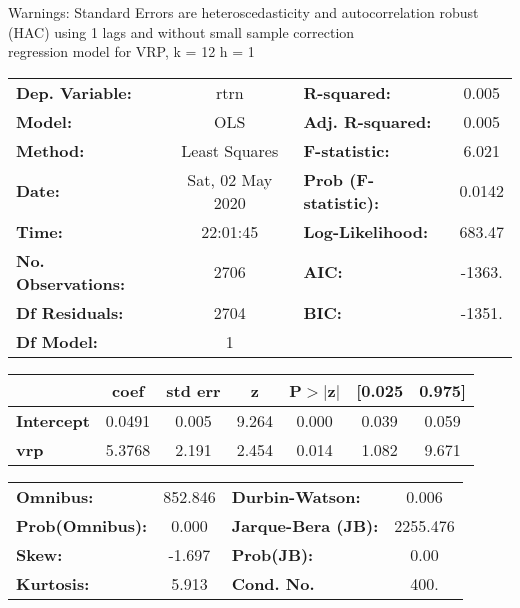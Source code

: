 Warnings: \newline
 [1] Standard Errors are heteroscedasticity and autocorrelation robust (HAC) using 1 lags and without small sample correction\\ 

regression model for VRP, k = 12 h = 1\begin{center}
\begin{tabular}{lclc}
\toprule
\textbf{Dep. Variable:}    &       rtrn       & \textbf{  R-squared:         } &     0.005   \\
\textbf{Model:}            &       OLS        & \textbf{  Adj. R-squared:    } &     0.005   \\
\textbf{Method:}           &  Least Squares   & \textbf{  F-statistic:       } &     6.021   \\
\textbf{Date:}             & Sat, 02 May 2020 & \textbf{  Prob (F-statistic):} &   0.0142    \\
\textbf{Time:}             &     22:01:45     & \textbf{  Log-Likelihood:    } &    683.47   \\
\textbf{No. Observations:} &        2706      & \textbf{  AIC:               } &    -1363.   \\
\textbf{Df Residuals:}     &        2704      & \textbf{  BIC:               } &    -1351.   \\
\textbf{Df Model:}         &           1      & \textbf{                     } &             \\
\bottomrule
\end{tabular}
\begin{tabular}{lcccccc}
                   & \textbf{coef} & \textbf{std err} & \textbf{z} & \textbf{P$> |$z$|$} & \textbf{[0.025} & \textbf{0.975]}  \\
\midrule
\textbf{Intercept} &       0.0491  &        0.005     &     9.264  &         0.000        &        0.039    &        0.059     \\
\textbf{vrp}       &       5.3768  &        2.191     &     2.454  &         0.014        &        1.082    &        9.671     \\
\bottomrule
\end{tabular}
\begin{tabular}{lclc}
\textbf{Omnibus:}       & 852.846 & \textbf{  Durbin-Watson:     } &    0.006  \\
\textbf{Prob(Omnibus):} &   0.000 & \textbf{  Jarque-Bera (JB):  } & 2255.476  \\
\textbf{Skew:}          &  -1.697 & \textbf{  Prob(JB):          } &     0.00  \\
\textbf{Kurtosis:}      &   5.913 & \textbf{  Cond. No.          } &     400.  \\
\bottomrule
\end{tabular}
\end{center}

